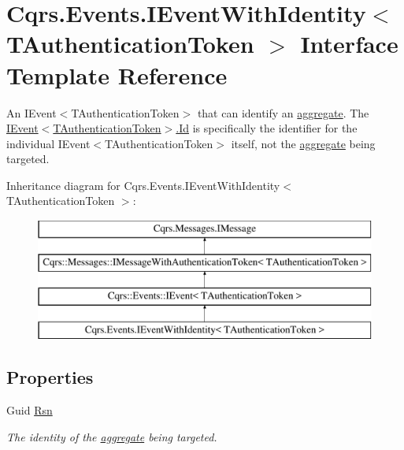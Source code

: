 \hypertarget{interfaceCqrs_1_1Events_1_1IEventWithIdentity}{}\section{Cqrs.\+Events.\+I\+Event\+With\+Identity$<$ T\+Authentication\+Token $>$ Interface Template Reference}
\label{interfaceCqrs_1_1Events_1_1IEventWithIdentity}


An I\+Event$<$\+T\+Authentication\+Token$>$ that can identify an \hyperlink{}{aggregate}. The \hyperlink{interfaceCqrs_1_1Events_1_1IEvent_a2974e13d307c62c5cc438d668ff1783b_a2974e13d307c62c5cc438d668ff1783b}{I\+Event$<$\+T\+Authentication\+Token$>$.\+Id} is specifically the identifier for the individual I\+Event$<$\+T\+Authentication\+Token$>$ itself, not the \hyperlink{}{aggregate} being targeted.  


Inheritance diagram for Cqrs.\+Events.\+I\+Event\+With\+Identity$<$ T\+Authentication\+Token $>$\+:\begin{figure}[H]
\begin{center}
\leavevmode
\includegraphics[height=4.000000cm]{interfaceCqrs_1_1Events_1_1IEventWithIdentity}
\end{center}
\end{figure}
\subsection*{Properties}
\begin{DoxyCompactItemize}
\item 
Guid \hyperlink{interfaceCqrs_1_1Events_1_1IEventWithIdentity_a4d87d8dd7304f4ce31ad8bcbf3f96789_a4d87d8dd7304f4ce31ad8bcbf3f96789}{Rsn}
\begin{DoxyCompactList}\small\item\em The identity of the \hyperlink{}{aggregate} being targeted. \end{DoxyCompactList}\end{DoxyCompactItemize}


